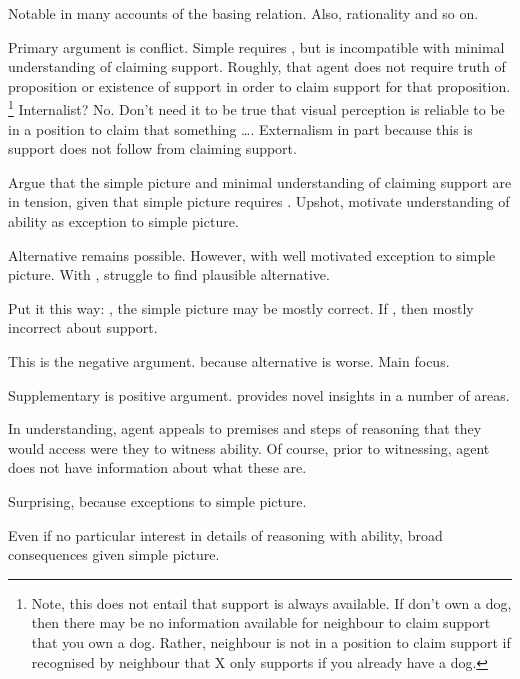 \begin{note}
  Notable in many accounts of the basing relation.
  Also, rationality and so on.

  Primary argument is conflict.
  Simple requires \AR{}, but \AR{} is incompatible with minimal understanding of claiming support.
  Roughly, that agent does not require truth of proposition or existence of support in order to claim support for that proposition.\nolinebreak
  \footnote{
    Note, this does not entail that support is always available.
    If don't own a dog, then there may be no information available for neighbour to claim support that you own a dog.
    Rather, neighbour is not in a position to claim support if recognised by neighbour that X only supports if you already have a dog.
  }
  Internalist?
  No.
  Don't need it to be true that visual perception is reliable to be in a position to claim that something \dots.
  Externalism in part because this is support does not follow from claiming support.

  Argue that the simple picture and minimal understanding of claiming support are in tension, given that simple picture requires \AR{}.
  Upshot, motivate \WR{} understanding of ability as exception to simple picture.

  Alternative remains possible.
  However, with \WR{} well motivated exception to simple picture.
  With \AR{}, struggle to find plausible alternative.

  Put it this way:
  \WR{}, the simple picture may be mostly correct.
  If \AR{}, then mostly incorrect about support.

  This is the negative argument.
  \WR{} because alternative is worse.
  Main focus.

  Supplementary is positive argument.
  \WR{} provides novel insights in a number of areas.
\end{note}


\begin{note}
  In \WR{} understanding, agent appeals to premises and steps of reasoning that they would access were they to witness ability.
  Of course, prior to witnessing, agent does not have information about what these are.

  Surprising, because exceptions to simple picture.

  Even if no particular interest in details of reasoning with ability, broad consequences given simple picture.
\end{note}

